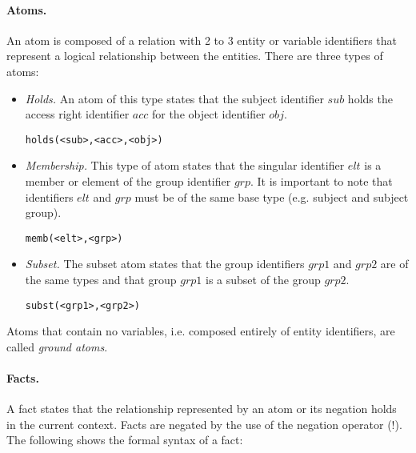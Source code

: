 \documentclass[global,twocolumn,final]{svjour}
\newenvironment{vverbatim}
  {\begin{alltt}}
  {\vspace{-\baselineskip}\end{alltt}}
\begin{document}
        \paragraph{Atoms.}
          An atom is composed of a relation with 2 to 3 entity or variable
          identifiers that represent a logical relationship between the
          entities. There are three types of atoms:

          \begin{itemize}
            \item
              {\em Holds.} An atom of this type states that the subject
              identifier $sub$ holds the access right identifier $acc$
              for the object identifier $obj$.

              \begin{vverbatim}
  holds(<sub>, <acc>, <obj>)
              \end{vverbatim}
            \item
              {\em Membership.} This type of atom states that the singular
              identifier $elt$ is a member or element of the group identifier
              $grp$. It is important to note that identifiers $elt$ and $grp$
              must be of the same base type (e.g. subject and subject group).

              \begin{vverbatim}
  memb(<elt>, <grp>)
              \end{vverbatim}
            \item
              {\em Subset.} The subset atom states that the group identifiers
              $grp1$ and $grp2$ are of the same types and that group $grp1$ is
              a subset of the group $grp2$.

              \begin{vverbatim}
  subst(<grp1>, <grp2>)
              \end{vverbatim}
          \end{itemize}

          Atoms that contain no variables, i.e. composed entirely of entity
          identifiers, are called {\em ground atoms}.

        \paragraph{Facts.}
          A fact states that the relationship represented by an atom or
          its negation holds in the current context. Facts are negated by the
          use of the negation operator ($!$). The following shows the formal
          syntax of a fact:
\end{document}
